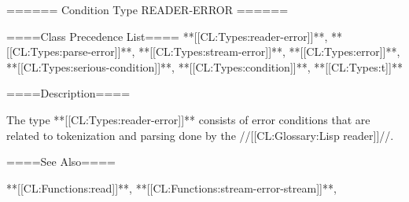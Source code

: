 ====== Condition Type READER-ERROR ======

====Class Precedence List==== **[[CL:Types:reader-error]]**, **[[CL:Types:parse-error]]**, **[[CL:Types:stream-error]]**, **[[CL:Types:error]]**, **[[CL:Types:serious-condition]]**, **[[CL:Types:condition]]**, **[[CL:Types:t]]**

====Description====

The type **[[CL:Types:reader-error]]** consists of error conditions that are related to tokenization and parsing done by the //[[CL:Glossary:Lisp reader]]//.

====See Also====

**[[CL:Functions:read]]**, **[[CL:Functions:stream-error-stream]]**, {\secref\ReaderConcepts}

